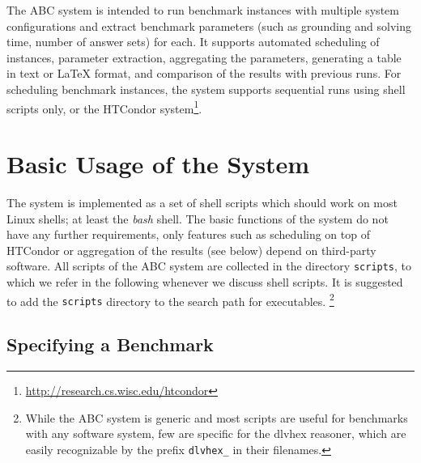 \documentclass[a4paper]{article}
\newcommand{\dlvhex}{{\sc dlvhex}}
\newcommand{\abcs}{{ABC}}
\begin{document}
		The \abcs{} system
		is intended to run benchmark instances with multiple system configurations
		and extract benchmark parameters (such as grounding and solving time, number of answer sets) for each.
		It supports automated scheduling of instances, parameter extraction,
		aggregating the parameters,
		generating a table in text or \LaTeX{} format,
		and comparison of the results with previous runs.
		For scheduling benchmark instances, the system supports sequential runs using shell scripts only,
		or the HTCondor system\footnote{\url{http://research.cs.wisc.edu/htcondor}}.

	\section{Basic Usage of the System}
	\label{sec:usage}

		The system is implemented as a set of shell scripts which should work on most Linux shells; at least the \emph{bash} shell.
		The basic functions of the system do not have any further requirements, only features such as scheduling on top of HTCondor
		or aggregation of the results (see below) depend on third-party software.
		All scripts of the \abcs{} system are collected in the directory {\tt scripts},
		to which we refer in the following whenever we discuss shell scripts.
		It is suggested to add the {\tt scripts} directory to the search path for executables.
		\footnote{While the \abcs{} system is generic and most scripts are useful for benchmarks with any software system,
		few are specific for the \dlvhex{} reasoner, which are easily recognizable by the prefix {\tt dlvhex\_} in their filenames.}

		\subsection{Specifying a Benchmark}
		\label{sec:usage:specifying}
\end{document}
